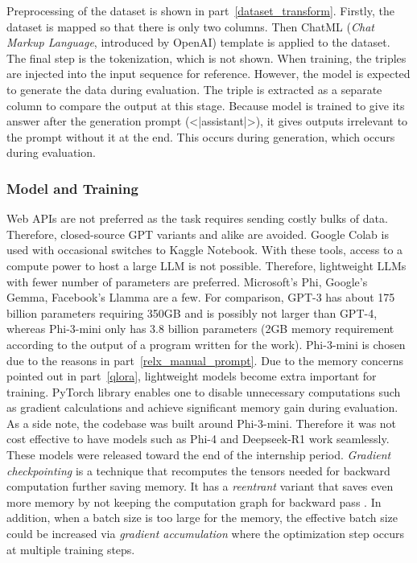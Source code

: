 \documentclass{article}
\begin{document}
Preprocessing of the dataset is shown in part~\ref{dataset_transform}. Firstly, the dataset is mapped so that there is only two columns. Then ChatML (\textit{Chat Markup Language}, introduced by OpenAI) template is applied to the dataset. The final step is the tokenization, which is not shown. When training, the triples are injected into the input sequence for reference. However, the model is expected to generate the data during evaluation. The triple is extracted as a separate column to compare the output at this stage. Because model is trained to give its answer after the generation prompt (<|assistant|>), it gives outputs irrelevant to the prompt without it at the end. This occurs during generation, which occurs during evaluation.\subsubsection{Model and Training}
Web APIs are not preferred as the task requires sending costly bulks of data. Therefore, closed-source GPT variants and alike are avoided. Google Colab is used with occasional switches to Kaggle Notebook. With these tools, access to a compute power to host a large LLM is not possible. Therefore, lightweight LLMs with fewer number of parameters are preferred. Microsoft's Phi, Google's Gemma, Facebook's Llamma are a few. For comparison, GPT-3 has about 175 billion parameters requiring 350GB \cite{brown_language_2020} and is possibly not larger than GPT-4, whereas Phi-3-mini only has 3.8 billion parameters \cite{abdin_phi-3_2024} (2GB memory requirement according to the output of a program written for the work). Phi-3-mini is chosen due to the reasons in part~\ref{relx_manual_prompt}. Due to the memory concerns pointed out in part~\ref{qlora}, lightweight models become extra important for training. PyTorch library enables one to disable unnecessary computations such as gradient calculations and achieve significant memory gain during evaluation. As a side note, the codebase was built around Phi-3-mini. Therefore it was not cost effective to have models such as Phi-4 and Deepseek-R1 work seamlessly. These models were released toward the end of the internship period. \textit{Gradient checkpointing} is a technique that recomputes the tensors needed for backward computation further saving memory. It has a \textit{reentrant} variant that saves even more memory by not keeping the computation graph for backward pass \cite{pytorch_contributors_torchutilscheckpoint_2024}. In addition, when a batch size is too large for the memory, the effective batch size could be increased via \textit{gradient accumulation} where the optimization step occurs at multiple training steps.
\end{document}
